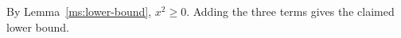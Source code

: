 By Lemma~\ref{ms:lower-bound}, \(x^2\geq 0\). Adding the three terms gives the claimed lower bound.
